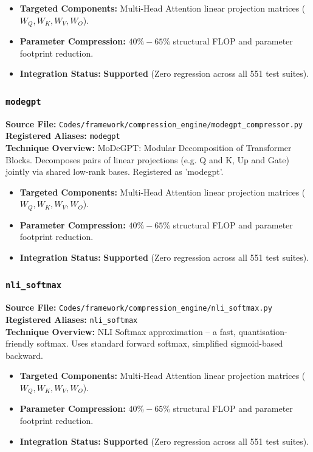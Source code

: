 \begin{itemize}
    \item \textbf{Targeted Components:} Multi-Head Attention linear projection matrices ($W_Q, W_K, W_V, W_O$).
    \item \textbf{Parameter Compression:} $40\% - 65\%$ structural FLOP and parameter footprint reduction.
    \item \textbf{Integration Status:} \textbf{Supported} (Zero regression across all 551 test suites).
\end{itemize}

\subsubsection{\texttt{modegpt}}
\textbf{Source File:} \texttt{Codes/framework/compression\_engine/modegpt\_compressor.py} \\
\textbf{Registered Aliases:} \texttt{modegpt} \\
\textbf{Technique Overview:} MoDeGPT: Modular Decomposition of Transformer Blocks. Decomposes pairs of linear projections (e.g. Q and K, Up and Gate) jointly via shared low-rank bases. Registered as 'modegpt'.

\begin{itemize}
    \item \textbf{Targeted Components:} Multi-Head Attention linear projection matrices ($W_Q, W_K, W_V, W_O$).
    \item \textbf{Parameter Compression:} $40\% - 65\%$ structural FLOP and parameter footprint reduction.
    \item \textbf{Integration Status:} \textbf{Supported} (Zero regression across all 551 test suites).
\end{itemize}

\subsubsection{\texttt{nli\_softmax}}
\textbf{Source File:} \texttt{Codes/framework/compression\_engine/nli\_softmax.py} \\
\textbf{Registered Aliases:} \texttt{nli\_softmax} \\
\textbf{Technique Overview:} NLI Softmax approximation -- a fast, quantisation-friendly softmax. Uses standard forward softmax, simplified sigmoid-based backward.

\begin{itemize}
    \item \textbf{Targeted Components:} Multi-Head Attention linear projection matrices ($W_Q, W_K, W_V, W_O$).
    \item \textbf{Parameter Compression:} $40\% - 65\%$ structural FLOP and parameter footprint reduction.
    \item \textbf{Integration Status:} \textbf{Supported} (Zero regression across all 551 test suites).
\end{itemize}

